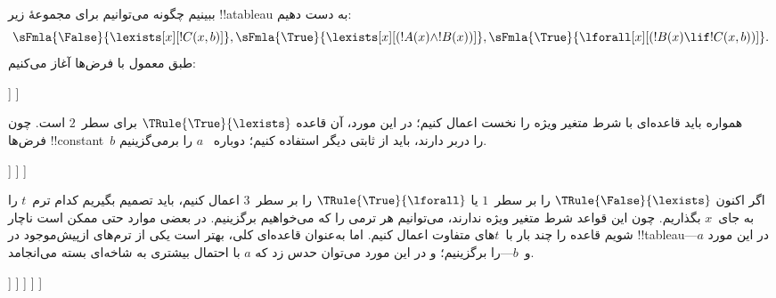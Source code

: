 \documentclass[../../../include/open-logic-section]{subfiles}
\begin{document}
\begin{ex}
ببینیم چگونه می‌توانیم برای مجموعهٔ زیر !!a{tableau} به دست دهیم:
\[
\sFmla{\False}{\lexists[x][!C(x,b)]},
\sFmla{\True}{\lexists[x][(!A(x) \land !B(x))]},
\sFmla{\True}{\lforall[x][(!B(x) \lif !C(x,b))]}.
\]
طبق معمول با فرض‌ها آغاز می‌کنیم:
\begin{oltableau}
  [\sFmla{\False}{\lexists[x][\formula{C}(x,b)]}, just=\TAss
    [\sFmla{\True}{\lexists[x][(\formula{A}(x) \land \formula{B}(x))]},
      just=\TAss
      [\sFmla{\True}{\lforall[x][(\formula{B}(x) \lif \formula{C}(x,b))]},
        just=\TAss]
    ]
  ]
\end{oltableau}
همواره باید قاعده‌ای با شرط متغیر ویژه را نخست اعمال کنیم؛ در این مورد،
آن قاعده $\TRule{\True}{\lexists}$ برای سطر~$2$ است. چون فرض‌ها
!!{constant}~$b$ را دربر دارند، باید از ثابتی دیگر استفاده کنیم؛ دوباره
~$a$ را برمی‌گزینیم.
\begin{oltableau}
  [\sFmla{\False}{\lexists[x][\formula{C}(x,b)]}, just=\TAss
    [\sFmla{\True}{\lexists[x][(\formula{A}(x) \land \formula{B}(x))]},
      just=\TAss, checked
      [\sFmla{\True}{\lforall[x][(\formula{B}(x) \lif \formula{C}(x,b))]},
        just=\TAss
        [\sFmla{\True}{\formula{A}(a) \land \formula{B}(a)},
          just={\TRule{\True}{\lexists}[2]}]
      ]
    ]
  ]
\end{oltableau}
اگر اکنون $\TRule{\False}{\lexists}$ را بر سطر~$1$ یا
$\TRule{\True}{\lforall}$ را بر سطر~$3$ اعمال کنیم، باید تصمیم بگیریم
کدام ترم~$t$ را به جای~$x$ بگذاریم. چون این قواعد شرط متغیر ویژه ندارند،
می‌توانیم هر ترمی را که می‌خواهیم برگزینیم. در بعضی موارد حتی ممکن است
ناچار شویم قاعده را چند بار با~$t$های متفاوت اعمال کنیم. اما به‌عنوان
قاعده‌ای کلی، بهتر است یکی از ترم‌های ازپیش‌موجود در !!{tableau}---در این
مورد $a$ و~$b$---را برگزینیم؛ و در این مورد می‌توان حدس زد که $a$ با
احتمال بیشتری به شاخه‌ای بسته می‌انجامد.
\begin{oltableau}
  [\sFmla{\False}{\lexists[x][\formula{C}(x,b)]}, just=\TAss
    [\sFmla{\True}{\lexists[x][(\formula{A}(x) \land \formula{B}(x))]},
      just=\TAss, checked
      [\sFmla{\True}{\lforall[x][(\formula{B}(x) \lif \formula{C}(x,b))]}, just=\TAss
        [\sFmla{\True}{\formula{A}(a) \land \formula{B}(a)}, just={\TRule{\True}{\lexists}[2]}
          [\sFmla{\False}{\formula{C}(a,b)}, just={\TRule{\False}{\lexists}[1]}
            [\sFmla{\True}{\formula{B}(a) \lif \formula{C}(a,b)},
              just={\TRule{\True}{\lforall}[3]}
            ]
          ]
        ]
      ]
    ]
  ]
\end{oltableau}

\end{ex}
\end{document}
